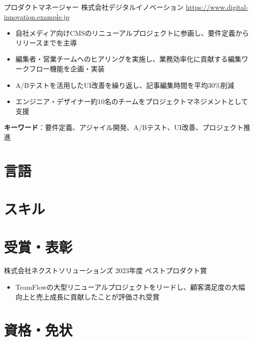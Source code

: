 \documentclass[a4paper, serif, 10pt]{moderncv}
\begin{document}
        {プロダクトマネージャー}
        {株式会社デジタルイノベーション}
        {\url{https://www.digital-innovation.example.jp}}
        {}
        {\begin{itemize}
\item 自社メディア向けCMSのリニューアルプロジェクトに参画し、要件定義からリリースまでを主導
\item 編集者・営業チームへのヒアリングを実施し、業務効率化に貢献する編集ワークフロー機能を企画・実装
\item A/Bテストを活用したUI改善を繰り返し、記事編集時間を平均30\%削減
\item エンジニア・デザイナー約10名のチームをプロジェクトマネジメントとして支援
\end{itemize}
\textbf{キーワード}：要件定義、アジャイル開発、A/Bテスト、UI改善、プロジェクト推進}
\section{言語}

\section{スキル}

\section{受賞・表彰}

        {株式会社ネクストソリューションズ}
        {2023年度 ベストプロダクト賞}
        {}
        {}
        {\begin{itemize}
\item TeamFlowの大型リニューアルプロジェクトをリードし、顧客満足度の大幅向上と売上成長に貢献したことが評価され受賞
\end{itemize}}
\section{資格・免状}
\end{document}
